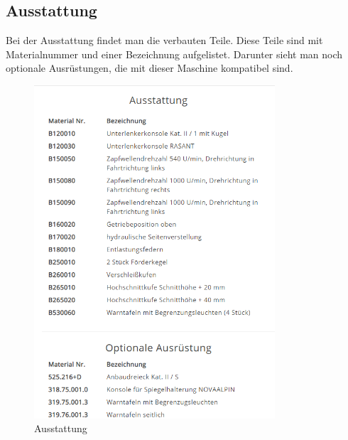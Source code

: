 \subsection{Ausstattung}
Bei der Ausstattung findet man die verbauten Teile. Diese Teile sind mit Materialnummer und einer Bezeichnung aufgelistet. Darunter sieht man noch optionale Ausrüstungen, die mit dieser Maschine kompatibel sind.
\begin{figure}[H]
	\centerline{
		\includegraphics[width=0.8\textwidth]{./grafiken/erm_detailansicht_ausstattung.PNG}
	}
	\vskip0pt
	\caption{Ausstattung} \label{fig:ausstattung}
\end{figure}
